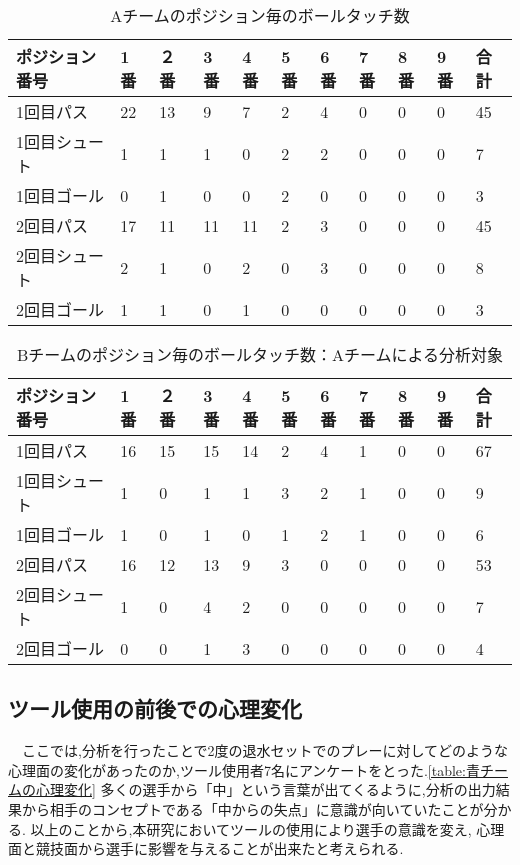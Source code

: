 \documentclass[../main.tex]{subfiles}
\begin{document}
\begin{table}[h]
  \caption{Aチームのポジション毎のボールタッチ数}\label{table:青チームのポジション毎のボールタッチ数}
  \begin{tabular}{lllllllllll}
    \hline\hline
  ポジション番号 & 1番 & ２番 & 3番 & 4番 & 5番 & 6番 & 7番 & 8番 & 9番 & 合計 \\
  \hline\hline
  1回目パス      & 22 & 13 & 9 & 7 & 2  & 4  & 0  & 0  & 0  & 45 \\
  1回目シュート      & 1 & 1 & 1 & 0 & 2  & 2  & 0  & 0  & 0  & 7 \\
  1回目ゴール     & 0 & 1 & 0 & 0  & 2  & 0  & 0  & 0  & 0  & 3 \\
  \hline
  2回目パス     & 17 & 11 & 11 & 11  & 2  & 3  & 0  & 0  & 0  & 45 \\
  2回目シュート     & 2 & 1 & 0 & 2  & 0  & 3  & 0  & 0  & 0  & 8 \\
  2回目ゴール     & 1 & 1 & 0 & 1  & 0  & 0  & 0  & 0  & 0  & 3 \\
  \hline
  \end{tabular}
  \end{table}

\begin{table}[h]
  \caption{Bチームのポジション毎のボールタッチ数：Aチームによる分析対象}\label{table:緑チームのポジション毎のボールタッチ数}
  \begin{tabular}{lllllllllll}
    \hline\hline
  ポジション番号 & 1番 & ２番 & 3番 & 4番 & 5番 & 6番 & 7番 & 8番 & 9番 & 合計 \\
  \hline\hline
  1回目パス      & 16 & 15 & 15 & 14 & 2  & 4  & 1  & 0  & 0  & 67 \\
  1回目シュート     & 1 & 0 & 1 & 1  & 3  & 2  & 1  & 0  & 0  & 9 \\
  1回目ゴール     & 1 & 0 & 1 & 0  & 1  & 2  & 1  & 0  & 0  & 6 \\
  \hline
  2回目パス      & 16 & 12 & 13 & 9  & 3  & 0  & 0  & 0  & 0  & 53 \\
  2回目シュート     & 1 & 0 & 4 & 2  & 0  & 0  & 0  & 0  & 0  & 7 \\
  2回目ゴール     & 0 & 0 & 1 & 3  & 0  &  0 & 0  & 0  & 0  & 4 \\
  \hline
  \end{tabular}
  \end{table}



\subsection{ツール使用の前後での心理変化}
\par　ここでは,分析を行ったことで2度の退水セットでのプレーに対してどのような心理面の変化があったのか,ツール使用者7名にアンケートをとった.\ref{table:青チームの心理変化}
多くの選手から「中」という言葉が出てくるように,分析の出力結果から相手のコンセプトである「中からの失点」に意識が向いていたことが分かる.
以上のことから,本研究においてツールの使用により選手の意識を変え,
心理面と競技面から選手に影響を与えることが出来たと考えられる.
\end{document}
